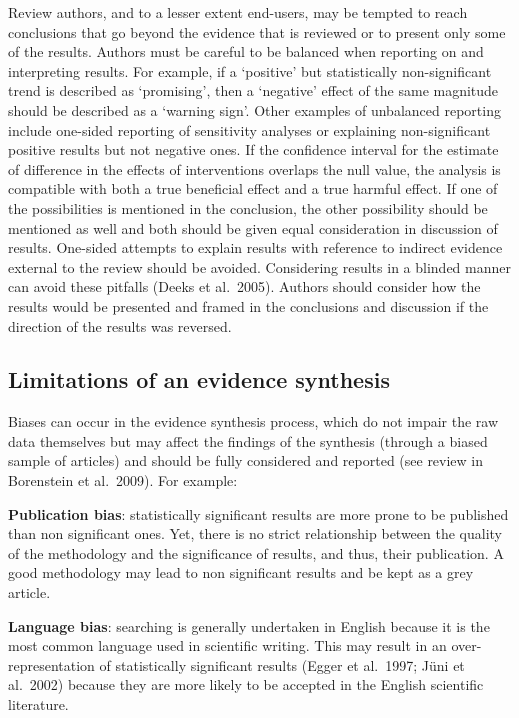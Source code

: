 \documentclass[
  letterpaper,
  DIV=11,
  numbers=noendperiod]{scrreprt}
\begin{document}
Review authors, and to a lesser extent end-users, may be tempted to
reach conclusions that go beyond the evidence that is reviewed or to
present only some of the results. Authors must be careful to be balanced
when reporting on and interpreting results. For example, if a `positive'
but statistically non-significant trend is described as `promising',
then a `negative' effect of the same magnitude should be described as a
`warning sign'. Other examples of unbalanced reporting include one-sided
reporting of sensitivity analyses or explaining non-significant positive
results but not negative ones. If the confidence interval for the
estimate of difference in the effects of interventions overlaps the null
value, the analysis is compatible with both a true beneficial effect and
a true harmful effect. If one of the possibilities is mentioned in the
conclusion, the other possibility should be mentioned as well and both
should be given equal consideration in discussion of results. One-sided
attempts to explain results with reference to indirect evidence external
to the review should be avoided. Considering results in a blinded manner
can avoid these pitfalls (Deeks et al.~2005). Authors should consider
how the results would be presented and framed in the conclusions and
discussion if the direction of the results was reversed.

\subsection{\texorpdfstring{\textbf{Limitations of an evidence
synthesis}}{Limitations of an evidence synthesis}}\label{limitations-of-an-evidence-synthesis}

Biases can occur in the evidence synthesis process, which do not impair
the raw data themselves but may affect the findings of the synthesis
(through a biased sample of articles) and should be fully considered and
reported (see review in Borenstein et al.~2009). For example:

\textbf{Publication bias}: statistically significant results are more
prone to be published than non significant ones. Yet, there is no strict
relationship between the quality of the methodology and the significance
of results, and thus, their publication. A good methodology may lead to
non significant results and be kept as a grey article.

\textbf{Language bias}: searching is generally undertaken in English
because it is the most common language used in scientific writing. This
may result in an over-representation of statistically significant
results (Egger et al.~1997; Jüni et al.~2002) because they are more
likely to be accepted in the English scientific literature.
\end{document}
